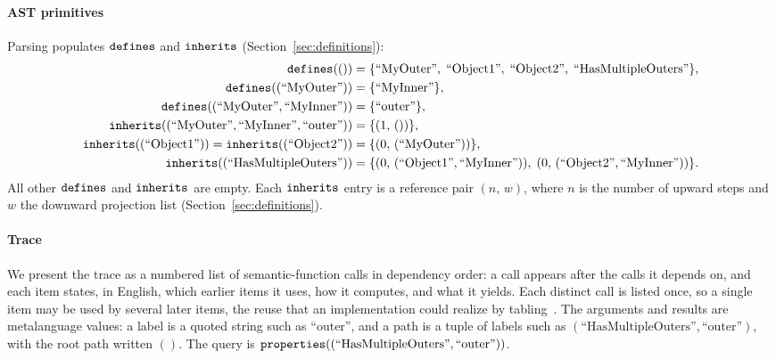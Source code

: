 \paragraph{AST primitives}
Parsing populates $\mathtt{defines}$ and $\mathtt{inherits}$
(Section~\ref{sec:definitions}):
\begin{align*}
  \mathtt{defines}(()) &= \{
    \text{``MyOuter''},\;
    \text{``Object1''},\;
    \text{``Object2''},\;
  \text{``HasMultipleOuters''}\}, \\
  \mathtt{defines}((\text{``MyOuter''})) &= \{\text{``MyInner''}\}, \\
  \mathtt{defines}((\text{``MyOuter''}, \text{``MyInner''})) &= \{\text{``outer''}\}, \\
  \mathtt{inherits}((\text{``MyOuter''}, \text{``MyInner''}, \text{``outer''})) &=
  \{(1,\, ())\}, \\
  \mathtt{inherits}((\text{``Object1''})) = \mathtt{inherits}((\text{``Object2''})) &=
  \{(0,\, (\text{``MyOuter''}))\}, \\
  \mathtt{inherits}((\text{``HasMultipleOuters''})) &=
  \{(0,\, (\text{``Object1''}, \text{``MyInner''})),\;
  (0,\, (\text{``Object2''}, \text{``MyInner''}))\}.
\end{align*}
All other $\mathtt{defines}$ and $\mathtt{inherits}$ are empty.
Each $\mathtt{inherits}$ entry is a reference pair $(n,\, w)$,
where $n$ is the number of upward steps and $w$ the
downward projection list (Section~\ref{sec:definitions}).

\paragraph{Trace}
We present the trace as a numbered list of semantic-function calls in
dependency order: a call appears after the calls it depends on, and each
item states, in English, which earlier items it uses, how it computes, and
what it yields. Each distinct call is listed once, so a single item may be
used by several later items, the reuse that an implementation could realize
by tabling~\cite{tamaki1986-tabled-resolution}.
The arguments and results are metalanguage values: a label is a quoted
string such as $\text{``outer''}$, and a path is a tuple of labels such as
$(\text{``HasMultipleOuters''}, \text{``outer''})$, with the root path
written $()$.
The query is
$\mathtt{properties}((\text{``HasMultipleOuters''}, \text{``outer''}))$.



